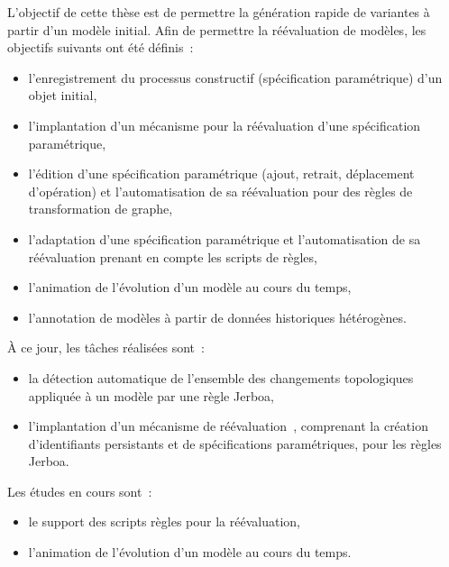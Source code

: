 \documentclass[11pt,a4paper,oneside]{article}
\begin{document}
L'objectif de cette thèse est de permettre la génération rapide de variantes à partir
d'un modèle initial. %
Afin de permettre la réévaluation de modèles, les objectifs suivants ont été définis~:
\begin{itemize}
	\item l'enregistrement du processus constructif (spécification paramétrique)
	      d'un objet initial,
	\item l'implantation d'un mécanisme pour la réévaluation d'une spécification
	      paramétrique,
	\item l'édition d'une spécification paramétrique (ajout, retrait, déplacement
	      d'opération) et l'automatisation de sa réévaluation pour des règles de transformation de graphe,
	\item l'adaptation d'une spécification paramétrique et l'automatisation de sa
	      réévaluation prenant en compte les scripts de règles,
	\item l'animation de l'évolution d'un modèle au cours du temps,
	\item l'annotation de modèles à partir de données historiques hétérogènes.
\end{itemize}
À ce jour, les tâches réalisées sont~:
\begin{itemize}
	\item la détection automatique de l'ensemble des changements
	      topologiques~\cite{gaide2023automatic} appliquée à un modèle par une
	      règle Jerboa,
	\item l'implantation d'un mécanisme de réévaluation~\cite{gaide2023model,
		      gaide2024reevaluation, gaide2024reevaluationfr}, comprenant la création d'identifiants
	      persistants et de spécifications paramétriques, pour les règles Jerboa.
\end{itemize}
Les études en cours sont~:
\begin{itemize}
	\item le support des scripts règles pour la réévaluation,
	\item l'animation de l'évolution d'un modèle au cours du temps.
\end{itemize}
\end{document}
